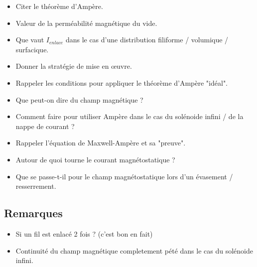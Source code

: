 \documentclass[a4paper, 11pt, hidelinks]{article}
\begin{document}
\begin{itemize}
    \item Citer le théorème d'Ampère. \cite{Chapitre11}
    \item Valeur de la perméabilité magnétique du vide. \cite{Chapitre11}
    \item Que vaut $I_{enlace}$ dans le cas d'une distribution filiforme / volumique / surfacique. \cite{Chapitre11}
    \item Donner la stratégie de mise en \oe uvre. \cite{Chapitre11}
    \item Rappeler les conditions pour appliquer le théorème d'Ampère "idéal". \cite{Chapitre11}
    \item Que peut-on dire du champ magnétique ? \cite{Chapitre11}
    \item Comment faire pour utiliser Ampère dans le cas du solénoide infini / de la nappe de courant ? \cite{Chapitre11}
    \item Rappeler l'équation de Maxwell-Ampère et sa "preuve". \cite{Chapitre11}
    \item Autour de quoi tourne le courant magnétostatique ? \cite{Chapitre11}
    \item Que se passe-t-il pour le champ magnétostatique lors d'un évasement / resserrement. \cite{Chapitre11}
\end{itemize}



\subsection{Remarques}


\begin{itemize}
    \item Si un fil est enlacé 2 fois ? (c'est bon en fait)
    \item Continuité du champ magnétique completement pété dans le cas du solénoide infini.
\end{itemize}











\end{document}
